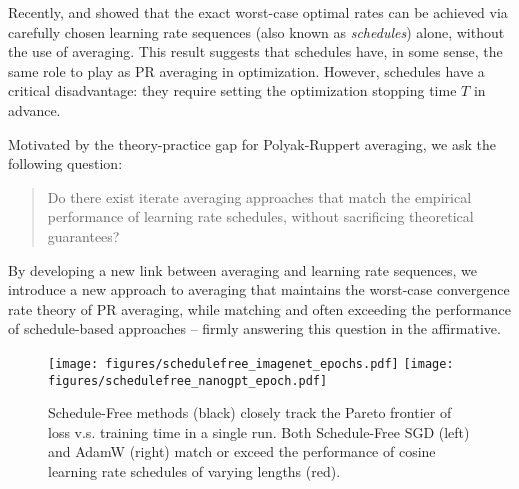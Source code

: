 \documentclass{article}
\begin{document}
Recently, \citet{zamani2023exact} and \citet{defazio2023when} showed that the exact worst-case optimal rates can be achieved via carefully chosen learning rate sequences (also known as \emph{schedules}) alone, without the use of averaging. This result suggests that schedules have, in some sense, the same role to play as PR averaging in optimization.  However, schedules have a critical disadvantage: they require setting the optimization stopping time $T$ in advance. 

Motivated by the theory-practice gap for Polyak-Ruppert averaging, we ask the following question:
\begin{quote}
    Do there exist iterate averaging approaches that match the empirical performance of learning rate schedules, without sacrificing theoretical guarantees?
\end{quote}
By developing a new link between averaging and learning rate sequences, we introduce a new approach to averaging that maintains the worst-case convergence rate theory of PR averaging, while matching and often exceeding the performance of schedule-based approaches -- firmly answering this question in the affirmative.
\begin{figure}
\centering \texttt{[image: figures/schedulefree\_imagenet\_epochs.pdf]}
\texttt{[image: figures/schedulefree\_nanogpt\_epoch.pdf]}
  \caption{Schedule-Free methods (black)  closely track the  Pareto frontier of loss v.s. training time in a single run. Both Schedule-Free SGD (left) and AdamW (right) match or exceed the performance of cosine learning rate schedules of varying lengths (red).}
  \label{fig:pareto}
\end{figure}
\end{document}
